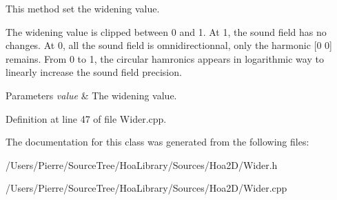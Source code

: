 This method set the widening value. 

The widening value is clipped between 0 and 1. At 1, the sound field has no changes. At 0, all the sound field is omnidirectionnal, only the harmonic \mbox{[}0 0\mbox{]} remains. From 0 to 1, the circular hamronics appears in logarithmic way to linearly increase the sound field precision.


\begin{DoxyParams}{Parameters}
{\em value} & The widening value. \\
\hline
\end{DoxyParams}


Definition at line 47 of file Wider.\-cpp.



The documentation for this class was generated from the following files\-:\begin{DoxyCompactItemize}
\item 
/\-Users/\-Pierre/\-Source\-Tree/\-Hoa\-Library/\-Sources/\-Hoa2\-D/Wider.\-h\item 
/\-Users/\-Pierre/\-Source\-Tree/\-Hoa\-Library/\-Sources/\-Hoa2\-D/Wider.\-cpp\end{DoxyCompactItemize}
